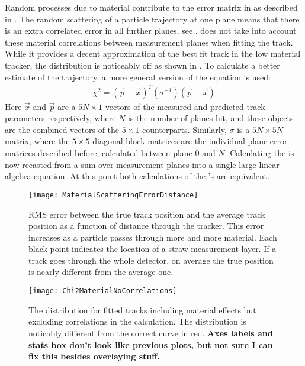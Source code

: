 Random processes due to material contribute to the error matrix in  as described in . The random scattering of a particle trajectory at one plane means that there is an extra correlated error in all further planes, see .  does not take into account these material correlations between measurement planes when fitting the track. While it provides a decent approximation of the best fit track in the low material tracker, the \chisq distribution is noticeably off as shown in . To calculate a better estimate of the trajectory, a more general version of the \chisq equation is used:
        \begin{align} \label{eq:chi2full}
            \chi^2 = (\vec{p}-\vec{x})^{T} (\sigma^{-1}) (\vec{p}-\vec{x})
        \end{align}
Here $\vec{x}$ and $\vec{p}$ are a $5N \times 1$ vectors of the measured and predicted track parameters respectively, where $N$ is the number of planes hit, and these objects are the combined vectors of the $5 \times 1$ counterparts. Similarly, $\sigma$ is a $5N \times 5N$ matrix, where the $5 \times 5$ diagonal block matrices are the individual plane error matrices described before, calculated between plane 0 and $N$. Calculating the \chisq is now recasted from a sum over measurement planes into a single large linear algebra equation. At this point both calculations of the \chisq's are equivalent.


\begin{figure}[]
  \centering
  \texttt{[image: MaterialScatteringErrorDistance]}
    \caption[Material scattering error in tracker]{RMS error between the true track position and the average track position as a function of distance through the tracker. This error increases as a particle passes through more and more material. Each black point indicates the location of a straw measurement layer. If a track goes through the whole detector, on average the true position is nearly  different from the average one.}
    \label{fig:MaterialScatteringErrorDistance}
\end{figure}

\begin{figure}[]
  \centering
  \texttt{[image: Chi2MaterialNoCorrelations]}
    \caption[\chisq for fitted tracks including material effects but no correlations]{The \chisq distribution for fitted tracks including material effects but excluding correlations in the calculation. The \chisq distribution is noticably different from the correct curve in red. \textbf{Axes labels and stats box don't look like previous plots, but not sure I can fix this besides overlaying stuff.}}
    \label{fig:Chi2MaterialNoCorrelations}
\end{figure}



